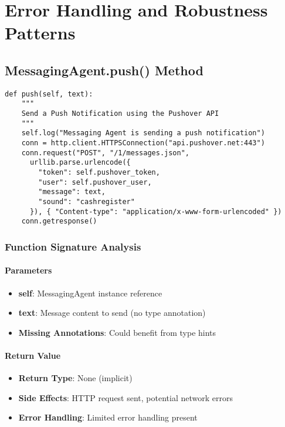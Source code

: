 \section{Error Handling and Robustness Patterns}

\subsection{MessagingAgent.push() Method}

\begin{lstlisting}[caption=Push Notification Error Handling]
def push(self, text):
    """
    Send a Push Notification using the Pushover API
    """
    self.log("Messaging Agent is sending a push notification")
    conn = http.client.HTTPSConnection("api.pushover.net:443")
    conn.request("POST", "/1/messages.json",
      urllib.parse.urlencode({
        "token": self.pushover_token,
        "user": self.pushover_user,
        "message": text,
        "sound": "cashregister"
      }), { "Content-type": "application/x-www-form-urlencoded" })
    conn.getresponse()
\end{lstlisting}

\subsubsection{Function Signature Analysis}

\paragraph{Parameters}
\begin{itemize}
\item \textbf{self}: MessagingAgent instance reference
\item \textbf{text}: Message content to send (no type annotation)
\item \textbf{Missing Annotations}: Could benefit from type hints
\end{itemize}

\paragraph{Return Value}
\begin{itemize}
\item \textbf{Return Type}: None (implicit)
\item \textbf{Side Effects}: HTTP request sent, potential network errors
\item \textbf{Error Handling}: Limited error handling present
\end{itemize}

